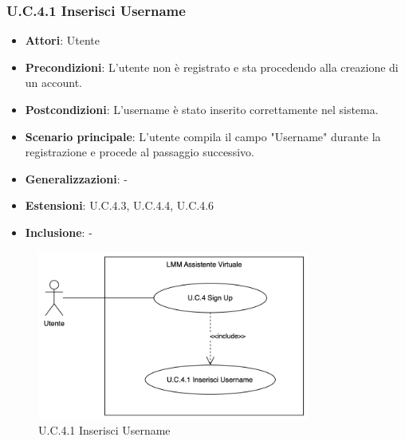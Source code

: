 \subsubsection{U.C.4.1 Inserisci Username}
\begin{itemize}
    \item \textbf{Attori}: Utente
    \item \textbf{Precondizioni}: L'utente non è registrato e sta procedendo alla creazione di un account.
    \item \textbf{Postcondizioni}: L'username è stato inserito correttamente nel sistema. 
    \item \textbf{Scenario principale}: L'utente compila il campo "Username" durante la registrazione e procede al passaggio successivo.
    \item \textbf{Generalizzazioni}: -
    \item \textbf{Estensioni}: U.C.4.3, U.C.4.4, U.C.4.6
    \item \textbf{Inclusione}: -
\end{itemize}
\begin{figure}[H]
    \centering
    \includegraphics[width=0.8\textwidth]{img/U.C.4.1.png}
    \caption{U.C.4.1 Inserisci Username}
\end{figure}
\newpage

